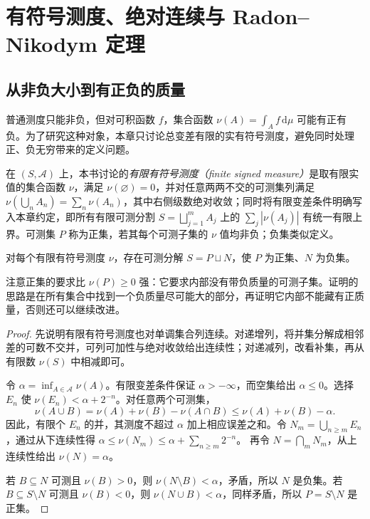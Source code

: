\setcounter{chapter}{10} %
\chapter{有符号测度、绝对连续与 Radon--Nikodym 定理}
\label{chap:mt-rn}

\section{从非负大小到有正负的质量}
普通测度只能非负，但对可积函数 $f$，集合函数 $\nu(A)=\int_Af\,\mathrm d\mu$ 可能有正有负。为了研究这种对象，本章只讨论总变差有限的实有符号测度，避免同时处理正、负无穷带来的定义问题。

\begin{definition}
在 $(S,\mathcal A)$ 上，本书讨论的\emph{有限有符号测度（finite signed measure）}是取有限实值的集合函数 $\nu$，满足 $\nu(\varnothing)=0$，并对任意两两不交的可测集列满足 $\nu(\bigcup_nA_n)=\sum_n\nu(A_n)$，其中右侧级数绝对收敛；同时将有限变差条件明确写入本章约定，即所有有限可测分割 $S=\bigsqcup_{j=1}^{m}A_j$ 上的 $\sum_j|\nu(A_j)|$ 有统一有限上界。可测集 $P$ 称为正集，若其每个可测子集的 $\nu$ 值均非负；负集类似定义。
\end{definition}

\begin{theorem}
对每个有限有符号测度 $\nu$，存在可测分解 $S=P\sqcup N$，使 $P$ 为正集、$N$ 为负集。
\label{thm:mt-hahn}
\end{theorem}
注意正集的要求比 $\nu(P)\geq0$ 强：它要求内部没有带负质量的可测子集。证明的思路是在所有集合中找到一个负质量尽可能大的部分，再证明它内部不能藏有正质量，否则还可以继续改进。

\begin{proof}
先说明有限有符号测度也对单调集合列连续。对递增列，将并集分解成相邻差的可数不交并，可列可加性与绝对收敛给出连续性；对递减列，改看补集，再从有限数 $\nu(S)$ 中相减即可。

令 $\alpha=\inf_{A\in\mathcal A}\nu(A)$。有限变差条件保证 $\alpha>-\infty$，而空集给出 $\alpha\leq0$。选择 $E_n$ 使 $\nu(E_n)<\alpha+2^{-n}$。对任意两个可测集，
\[
 \nu(A\cup B)=\nu(A)+\nu(B)-\nu(A\cap B)
 \leq\nu(A)+\nu(B)-\alpha.
\]
因此，有限个 $E_n$ 的并，其测度不超过 $\alpha$ 加上相应误差之和。令 $N_m=\bigcup_{n\geq m}E_n$，通过从下连续性得
$\alpha\leq\nu(N_m)\leq\alpha+\sum_{n\geq m}2^{-n}$。
再令 $N=\bigcap_mN_m$，从上连续性给出 $\nu(N)=\alpha$。

若 $B\subseteq N$ 可测且 $\nu(B)>0$，则 $\nu(N\setminus B)<\alpha$，矛盾，所以 $N$ 是负集。若 $B\subseteq S\setminus N$ 可测且 $\nu(B)<0$，则 $\nu(N\cup B)<\alpha$，同样矛盾，所以 $P=S\setminus N$ 是正集。
\end{proof}


